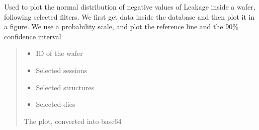 \documentclass[letterpaper,10pt,english]{sphinxmanual}
\begin{document}
\begin{fulllineitems}
\label{\detokenize{normal_plots:normal_plots.Leakage_normal_distrib_neg}}
\pysigstartsignatures
{}
\pysigstopsignatures
\sphinxAtStartPar
Used to plot the normal distribution of negative values of Leakage inside a wafer, following selected filters.
We first get data inside the database and then plot it in a figure. We use a probability scale, and plot the reference line and the 90\% confidence interval
\begin{quote}\begin{description}
\begin{itemize}
\item {} 
\sphinxAtStartPar
{} \textendash{} ID of the wafer

\item {} 
\sphinxAtStartPar
{} \textendash{} Selected sessions

\item {} 
\sphinxAtStartPar
{} \textendash{} Selected structures

\item {} 
\sphinxAtStartPar
{} \textendash{} Selected dies

\end{itemize}

\sphinxAtStartPar
The plot, converted into base64

\end{description}\end{quote}

\end{fulllineitems}

\end{document}
